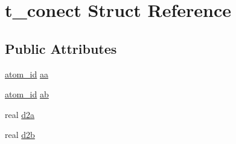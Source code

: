 \hypertarget{structt__conect}{\section{t\-\_\-conect \-Struct \-Reference}
\label{structt__conect}
}
\subsection*{\-Public \-Attributes}
\begin{DoxyCompactItemize}
\item 
\hyperlink{include_2types_2simple_8h_ad3f47cdb48677e516e2049719612c737}{atom\-\_\-id} \hyperlink{structt__conect_a6ce67a9eb8e7f83591567e50b88dda78}{aa}
\item 
\hyperlink{include_2types_2simple_8h_ad3f47cdb48677e516e2049719612c737}{atom\-\_\-id} \hyperlink{structt__conect_a728ff78f30167e6337fc20d7dd6e38f6}{ab}
\item 
real \hyperlink{structt__conect_a224664af54a72818245521bdaf3a7058}{d2a}
\item 
real \hyperlink{structt__conect_a4b8bc074b63f65b1272c0a0e3e0befd8}{d2b}
\end{DoxyCompactItemize}


